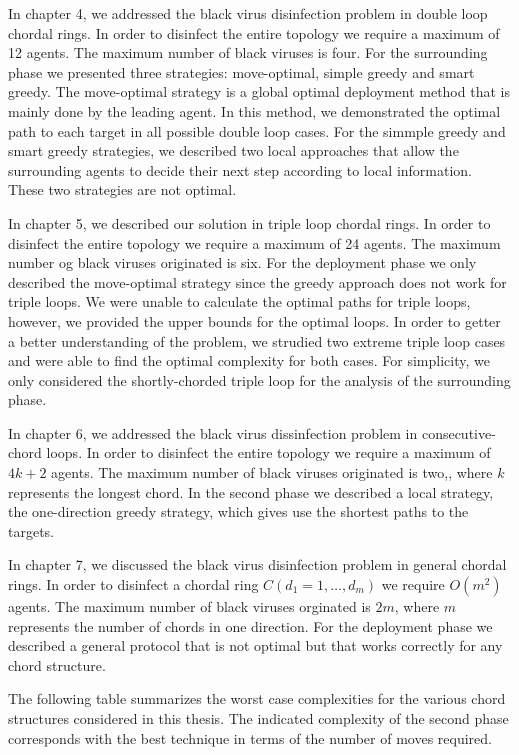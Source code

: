 In chapter  4, we addressed the black virus disinfection problem in double loop chordal rings. In order to disinfect the entire topology we require a maximum of 12 agents. The maximum number of black viruses is four. For the surrounding phase we presented three strategies:  move-optimal, simple greedy and smart greedy.  The move-optimal strategy is a global optimal deployment method that is mainly done by the leading agent. In this method, we demonstrated the optimal path to each target in all possible double loop cases.
For the simmple greedy and smart greedy strategies, we described two local approaches that allow the surrounding agents to decide their next step according to local information. These two strategies are not optimal.

In chapter 5, we described our solution in triple loop chordal rings. In order to disinfect the entire topology we require a maximum of 24 agents. The maximum number og black viruses originated is six. For the deployment phase we only described the move-optimal strategy since the greedy approach does not work for triple loops. We were unable to calculate the optimal paths for triple loops, however, we provided the upper bounds for the optimal loops. In order to getter a better understanding of the problem, we strudied two extreme triple loop cases and were able to find the optimal complexity for both cases. For simplicity, we only considered the shortly-chorded triple loop for the analysis of the surrounding phase. 

In chapter 6, we addressed the black virus dissinfection problem in  consecutive-chord loops. In order to disinfect the entire topology we require a maximum of $4k+2$ agents. The maximum number of black viruses originated is two,, where $k$ represents the longest chord. In the second phase we described a local strategy, the one-direction greedy strategy, which gives use the shortest paths to the targets.

In chapter 7, we discussed the black virus disinfection problem in general  chordal rings. In order to disinfect a chordal ring $C(d_1=1,\ldots, d_m)$ we require  $O(m^2)$ agents. The maximum number of black viruses orginated is  $2m$, where $m$ represents the number of chords in one direction. For the deployment phase we described a general protocol that is not optimal but that works correctly for any chord structure.

The following table summarizes the worst case complexities for the various chord structures considered in this thesis. The indicated complexity of the second phase corresponds with the best technique in terms of the number of moves required. 

